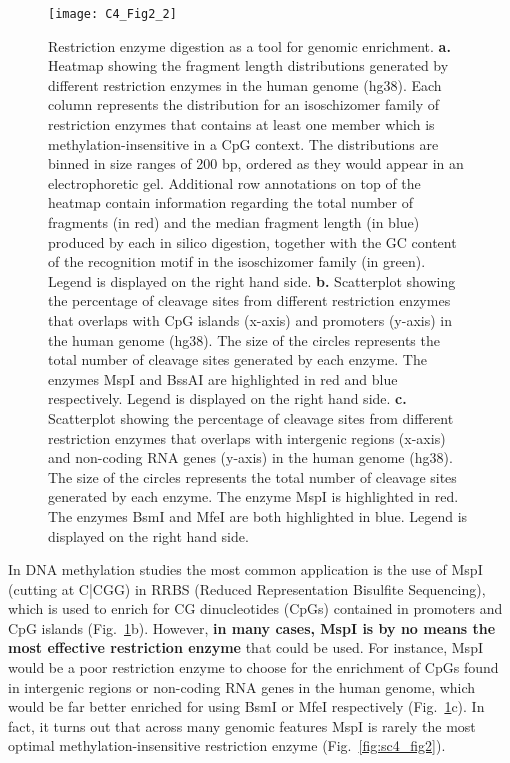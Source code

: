 \begin{figure}[htbp!] 
	\centering  
	\texttt{[image: C4\_Fig2\_2]}
	\vspace*{3mm}
	\caption[Restriction enzyme digestion as a tool for genomic enrichment]{Restriction enzyme digestion as a tool for genomic enrichment. \textbf{a.} Heatmap showing the fragment length distributions generated by different restriction enzymes in the human genome (\acrshort{hg38}). Each column represents the distribution for an isoschizomer family of restriction enzymes that contains at least one member which is methylation-insensitive in a CpG context. The distributions are binned in size ranges of 200 \acrshort{bp}, ordered as they would appear in an electrophoretic gel. Additional row annotations on top of the heatmap contain information regarding the total number of fragments (in red) and the median fragment length (in blue) produced by each in silico digestion, together with the GC content of the recognition motif in the isoschizomer family (in green). Legend is displayed on the right hand side. \textbf{b.} Scatterplot showing the percentage of cleavage sites from different restriction enzymes that overlaps with CpG islands (x-axis) and promoters (y-axis) in the human genome (hg38). The size of the circles represents the total number of cleavage sites generated by each enzyme. The enzymes MspI and BssAI are highlighted in red and blue respectively. Legend is displayed on the right hand side. \textbf{c.} Scatterplot showing the percentage of cleavage sites from different restriction enzymes that overlaps with intergenic regions (x-axis) and non-coding \acrshort{RNA} genes (y-axis) in the human genome (hg38). The size of the circles represents the total number of cleavage sites generated by each enzyme. The enzyme MspI is highlighted in red. The enzymes BsmI and MfeI are both highlighted in blue. Legend is displayed on the right hand side.}
	\label{fig:c4_fig2}
\end{figure}

\bigskip

In DNA methylation studies the most common application is the use of MspI (cutting at C|CGG) in RRBS (Reduced Representation Bisulfite Sequencing), which is used to enrich for CG dinucleotides (CpGs) contained in promoters and CpG islands \citep{Meissner2008} (Fig.~\ref{fig:c4_fig2}b). However, \textbf{in many cases, MspI is by no means the most effective restriction enzyme} that could be used. For instance, MspI would be a poor restriction enzyme to choose for the enrichment of CpGs found in intergenic regions or non-coding RNA genes in the human genome, which would be far better enriched for using BsmI or MfeI respectively (Fig.~\ref{fig:c4_fig2}c). In fact, it turns out that across many genomic features MspI is rarely the most optimal methylation-insensitive restriction enzyme (Fig.~\ref{fig:sc4_fig2}). 

